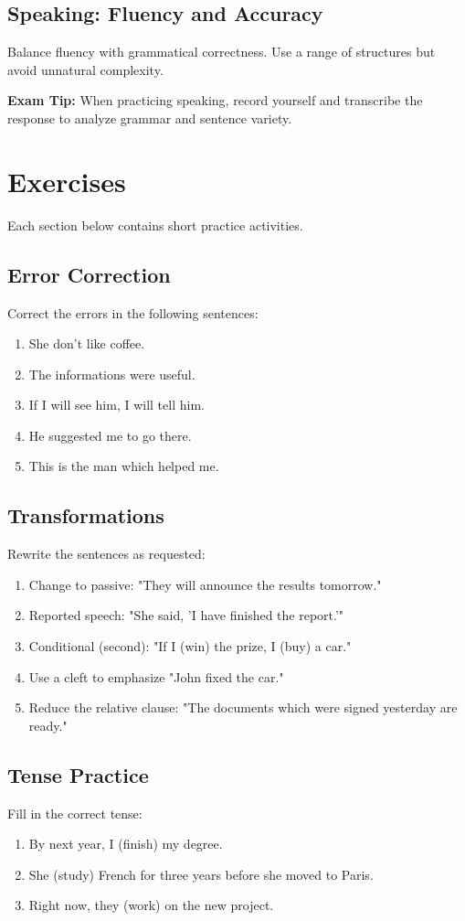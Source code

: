 \documentclass[12pt,oneside]{book}
\newcommand{\tip}[1]{\begin{examptip}\textbf{Exam Tip:} #1\end{examptip}}
\begin{document}
\section{Speaking: Fluency and Accuracy}
Balance fluency with grammatical correctness. Use a range of structures but avoid unnatural complexity.

\tip{When practicing speaking, record yourself and transcribe the response to analyze grammar and sentence variety.}

\chapter{Exercises}
Each section below contains short practice activities.

\section{Error Correction}
Correct the errors in the following sentences:
\begin{enumerate}
  \item She don't like coffee.
  \item The informations were useful.
  \item If I will see him, I will tell him.
  \item He suggested me to go there.
  \item This is the man which helped me.
\end{enumerate}

\section{Transformations}
Rewrite the sentences as requested:
\begin{enumerate}
  \item Change to passive: "They will announce the results tomorrow." 
  \item Reported speech: "She said, 'I have finished the report.'"
  \item Conditional (second): "If I (win) the prize, I (buy) a car." 
  \item Use a cleft to emphasize "John fixed the car." 
  \item Reduce the relative clause: "The documents which were signed yesterday are ready." 
\end{enumerate}

\section{Tense Practice}
Fill in the correct tense:
\begin{enumerate}
  \item By next year, I (finish) my degree.
  \item She (study) French for three years before she moved to Paris.
  \item Right now, they (work) on the new project.
\end{enumerate}
\end{document}
